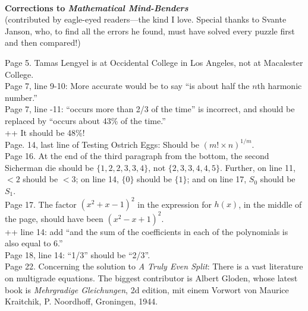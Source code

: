 \documentclass[11pt]{article}
\newlength{\originalbase}
\newcommand{\spacing}[1]{\setlength{\baselineskip}{#1\originalbase}}
\begin{document}
\spacing{1}

~

\begin{center}
{\bf \large Corrections to {\em Mathematical Mind-Benders}}\\[3mm]
(contributed by eagle-eyed readers---the kind I love.  Special
thanks to Svante Janson, who, to find all the errors he found,
must have solved every puzzle first and then compared!)
\end{center}

\bigskip

Page 5. Tamas Lengyel is at Occidental College in Los Angeles,
not at Macalester College.\\

Page 7, line 9-10: More accurate would be to say ``is about
half the $n$th harmonic number.''\\

Page 7, line -11: ``occurs more than 2/3 of the time'' is incorrect,
and should be replaced by ``occurs about 43\% of the time.''\\

++ It should be 48\%!\\

Page. 14, last line of Testing Ostrich Eggs: Should be $(m! \times n)^{1/m}$.\\

Page 16. At the end of the third paragraph from the bottom, the
second Sicherman die should be $\{1,2,2,3,3,4\}$, not $\{2,3,3,4,4,5\}$.
Further, on line 11, $<2$ should be $<3$; on line 14,
$\{0\}$ should be $\{1\}$; and on line 17, $S_0$ should be $S_1$.\\

Page 17. The factor $(x^2+x-1)^2$ in the expression for $h(x)$, in the middle
of the page, should have been $(x^2-x+1)^2$.\\

++ line 14: add ``and the sum of the coefficients in each of the polynomials is also equal to 6.''\\

Page 18, line 14: ``1/3'' should be ``2/3''.\\

Page 22. Concerning the solution to {\em A Truly Even Split}:
There is a vast literature on multigrade equations.
The biggest contributor is Albert Gloden, whose latest book
is {\em Mehrgradige Gleichungen}, 2d edition, mit einem Vorwort von Maurice Kraitchik,
P. Noordhoff, Groningen, 1944.\\
\end{document}
